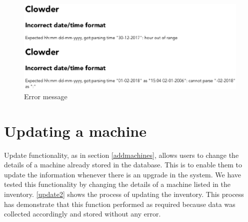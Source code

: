 \begin{figure}
\includegraphics[width=\linewidth]{dateformat2.eps}
\caption{Error message}
\label{error}
\end{figure}

\pagebreak
\section*{Updating a machine}
Update functionality, as in section \ref{addmachines}, allows users to change the details of a machine already stored in the database. This is to enable them to update the information whenever there is an upgrade in the system. We have tested this functionality by changing the details of a machine listed in the inventory. \autoref{update2} shows the process of updating the inventory. This process has demonstrate that this function performed as required because data was collected accordingly and stored without any error.

